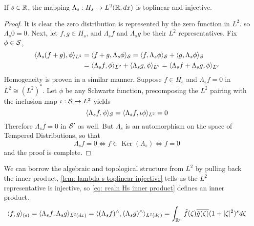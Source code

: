 \documentclass[../main-v2-manifolds.tex]{subfiles}
\begin{document}
\begin{lemma}\label{lem: lambda s toplinear injective}
If $s\in\mathbb{R}$, the mapping $\Lambda_s: H_s\to L^2(\mathbb{R},dx)$ is toplinear and injective.
\end{lemma}
\begin{proof}
    It is clear the zero distribution is represented by the zero function in $L^2$. so $\Lambda_s 0 = 0$. Next, let $f,g\in H_s$, and $\Lambda_s f$ and $\Lambda_s g$ be their $L^2$ representatives. Fix $\phi\in \mathcal{S}$, 
    \begin{align*}
    \langle\Lambda_s (f+g), \phi\rangle_{L^2} &= \langle f+g,\Lambda_s \phi\rangle_{\mathcal{S}}= \langle f,\Lambda_s \phi\rangle_{\mathcal{S}} + \langle g,\Lambda_s \phi\rangle_{\mathcal{S}}\\
    &= \langle \Lambda_s f,\phi\rangle_{L^2} + \langle \Lambda_s g,\phi\rangle_{L^2}= \langle \Lambda_s f + \Lambda_s g,\phi\rangle_{L^2}
    \end{align*}
    Homogeneity is proven in a similar manner. Suppose $f\in H_s$ and $\Lambda_s f=0$ in $L^2\cong (L^2)^*$. Let $\phi$ be any Schwartz function, precomposing the $L^2$ pairing with the inclusion map $\iota: \mathcal{S}\to L^2$ yields
    \[
    \langle \Lambda_s f, \phi\rangle_{\mathcal{S}} = \langle \Lambda_s f, \iota\phi\rangle_{L^2} = 0
    \]
    Therefore $\Lambda_s f = 0$ in $\mathcal{S}'$ as well. But $\Lambda_s$ is an automorphism on the space of Tempered Distributions, so that
    \[
    \Lambda_s f = 0 \iff f\in \operatorname{Ker}(\Lambda_s) \iff f = 0
    \]
    and the proof is complete.
\end{proof}

We can borrow the algebraic and topological structure from $L^2$ by pulling back the inner product, \cref{lem: lambda s toplinear injective} tells us the $L^2$ representative is injective, so \cref{eq: realn Hs inner product} defines an inner product.
\begin{equation}\label{eq: realn Hs inner product}
\langle f,g\rangle_{(s)} =  \langle \Lambda_s f,\Lambda_s g\rangle_{L^2(dx)} = \langle (\Lambda_s f)^{\wedge} ,(\Lambda_s g)^{\wedge} \rangle_{L^2(d\zeta)} = \int_{{\mathbb{R}^n}}\hat{f}(\zeta)\overline{\hat{g}(\zeta)}(1+\vert {\zeta} \vert^2)^s d\zeta
\end{equation}
\end{document}
